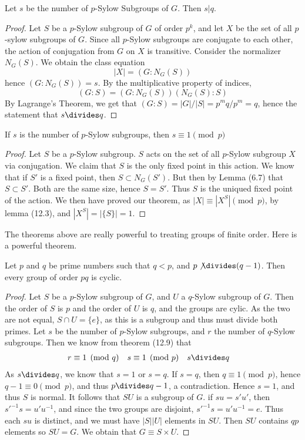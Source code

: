 \begin{theorem}
    Let $s$ be the number of $p$-Sylow Subgroups of $G$. Then $s | q$.
\end{theorem}
\begin{proof}
    Let $S$ be a $p$-Sylow subgroup of $G$ of order $p^k$, and let $X$ be the set of all $p$-sylow subgroups of $G$. Since all $p$-Sylow subgroups are conjugate to each other, the action of conjugation from $G$ on $X$ is transitive. Consider the normalizer $N_G(S)$. We obtain the class equation
    \[ |X| = (G:N_G(S)) \]
    hence $(G:N_G(S)) = s$. By the multiplicative property of indices,
    \[ (G:S) = (G:N_G(S))(N_G(S):S) \]
    By Lagrange's Theorem, we get that $(G:S) = |G|/|S| = p^mq/p^m = q$, hence the statement that $s \divides q$.
\end{proof}

\begin{theorem}
If $s$ is the number of $p$-Sylow subgroups, then $s \equiv 1 \pmod{p}$
\end{theorem}
\begin{proof}
    Let $S$ be a $p$-Sylow subgroup. $S$ acts on the set of all $p$-Sylow subgroup $X$ via conjugation. We claim that $S$ is the only fixed point in this action. We know that if $S'$ is a fixed point, then $S \subset N_G(S')$. But then by Lemma (6.7) that $S \subset S'$. Both are the same size, hence $S = S'$. Thus $S$ is the uniqued fixed point of the action. We then have proved our theorem, as $|X| \equiv |X^S| \pmod{p}$, by lemma (12.3), and $|X^S| = |\{S\}| = 1$.
\end{proof}

The theorems above are really powerful to treating groups of finite order. Here is a powerful theorem.

\begin{theorem}
    Let $p$ and $q$ be prime numbers such that $q < p$, and $p \not \divides (q-1)$. Then every group of order $pq$ is cyclic.
\end{theorem}
\begin{proof}
    Let $S$ be a $p$-Sylow subgroup of $G$, and $U$ a $q$-Sylow subgroup of $G$. Then the order of $S$ is $p$ and the order of $U$ is $q$, and the groups are cylic. As the two are not equal, $S \cap U = \{ e \}$, as this is a subgroup and thus must divide both primes. Let $s$ be the number of $p$-Sylow subgroups, and $r$ the number of $q$-Sylow subgroups. Then we know from theorem (12.9) that
    \begin{align*} r &\equiv 1 \pmod{q} & s &\equiv 1 \pmod{p} & s &\divides q \end{align*}
    As $s \divides q$, we know that $s = 1$ or $s = q$. If $s = q$, then $q \equiv 1 \pmod{p}$, hence $q-1 \equiv 0 \pmod{p}$, and thus $p \divides q-1$, a contradiction. Hence $s = 1$, and thus $S$ is normal. It follows that $SU$ is a subgroup of $G$. if $su = s'u'$, then $s'^{-1}s = u'u^{-1}$, and since the two groups are disjoint, $s'^{-1}s = u'u^{-1} = e$. Thus each $su$ is distinct, and we must have $|S||U|$ elements in $SU$. Then $SU$ contains $qp$ elements so $SU = G$. We obtain that $G \equiv S \times U$.
\end{proof}

